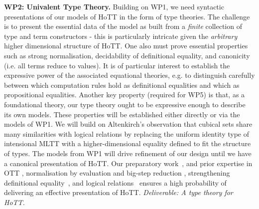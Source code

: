 \documentclass[a4paper,11pt]{article}
\begin{document}

{\bf WP2: Univalent Type Theory.} Building on WP1, we need syntactic
presentations of our models of HoTT in the form of type theories. The
challenge is to present the essential data of the model as built from
a {\em finite} collection of type and term constructors - this is
particularly intricate given the {\em arbitrary} higher dimensional
structure of HoTT. One also must prove essential properties such as strong normalisation, decidability of
definitional equality, and canonicity (i.e. all terms reduce to
values). It is of particular interest to establish the expressive
power of the associated equational theories, e.g. to distinguish
carefully between which computation rules hold as definitional
equalities and which as propositional equalities. Another key property
(required for WP5) is that, as a foundational theory, our type theory
ought to be expressive enough to describe its own models. These
properties will be established either directly or via the models of
WP1.
We will build on Altenkirch's observation \cite{txa-ihp14} that cubical sets share
many similarities with logical relations by replacing the uniform
identity type of intensional MLTT with a higher-dimensional equality
defined to fit the structure of types. The models from WP1 will drive
refinement of our design until we have a canonical presentation of
HoTT. Our preparatory work~\cite{txa-ihp14}, and prior expertise in OTT
\cite{alti:ott-conf}, normalisation by evaluation and big-step
reduction \cite{alti:ctcs95,alti:lics96,alti:flops04,txa:jtait},
strengthening definitional
equality~\cite{Allais:2013:NEN:2502409.2502411}, and logical
relations~\cite{neil2014relParamDep} ensures a high probability of
delivering an effective presentation of HoTT.  {\em Deliverable: A
  type theory for HoTT. 
}

\end{document}
